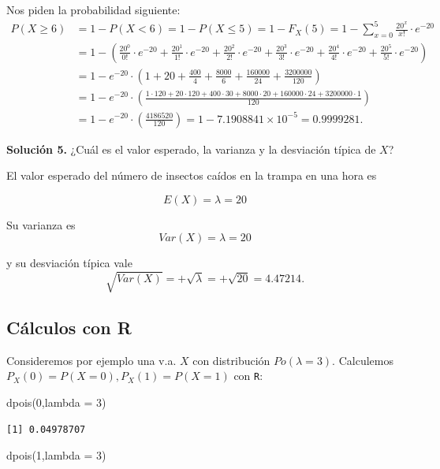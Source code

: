 \documentclass[
  letterpaper,
  DIV=11,
  numbers=noendperiod]{scrreprt}
\newenvironment{Shaded}{\begin{snugshade}}{\end{snugshade}}
\newcommand{\AttributeTok}[1]{\textcolor[rgb]{0.40,0.45,0.13}{#1}}
\newcommand{\DecValTok}[1]{\textcolor[rgb]{0.68,0.00,0.00}{#1}}
\newcommand{\FunctionTok}[1]{\textcolor[rgb]{0.28,0.35,0.67}{#1}}
\newcommand{\NormalTok}[1]{\textcolor[rgb]{0.00,0.23,0.31}{#1}}
\begin{document}
Nos piden la probabilidad siguiente: \[
\begin{array}{rl}
 P(X\geq 6)&=1- P(X<6)=1-P(X\leq 5)=1-F_X(5)=1-\displaystyle\sum_{x=0}^{5} \frac{20^{x}}{x!}\cdot e^{-20}\\
 &=
 1-\left(\frac{20^{0}}{0!}\cdot e^{-20}+\frac{20^{1}}{1!}\cdot e^{-20}+\frac{20^{2}}{2!}\cdot e^{-20}+\frac{20^{3}}{3!}\cdot e^{-20}+\frac{20^{4}}{4!}\cdot e^{-20}+\frac{20^{5}}{5!}\cdot e^{-20}\right)\\
 &=
 1-e^{-20}\cdot \left(1+20+\frac{400}{4}+\frac{8000}{6}+\frac{160000}{24}+\frac{3200000}{120}\right)\\
 &=
 1-e^{-20} \cdot \left(\frac{1 \cdot 120+20\cdot 120+400\cdot 30+8000\cdot 20+160000\cdot 24+3200000\cdot 1}{120}\right)\\
 &= 1-e^{-20}\cdot\left(\frac{4186520}{120}\right)=1-\ensuremath{7.1908841\times 10^{-5}} =0.9999281.
\end{array}
\]

\textbf{Solución 5.} ¿Cuál es el valor esperado, la varianza y la
desviación típica de \(X\)?

El valor esperado del número de insectos caídos en la trampa en una hora
es

\[E(X)=\lambda=20\]

Su varianza es \[Var(X)=\lambda=20\]

y su desviación típica vale
\[\sqrt{Var(X)}=+\sqrt{\lambda}=+\sqrt{20}=4.47214.\]

\subsection{Cálculos con R}\label{cuxe1lculos-con-r-1}

Consideremos por ejemplo una v.a. \(X\) con distribución
\(Po(\lambda=3)\). Calculemos \(P_X(0)=P(X=0), P_X(1)=P(X=1)\) con
\texttt{R}:

\begin{Shaded}
\begin{Highlighting}[]
\FunctionTok{dpois}\NormalTok{(}\DecValTok{0}\NormalTok{,}\AttributeTok{lambda =} \DecValTok{3}\NormalTok{)}
\end{Highlighting}
\end{Shaded}

\begin{verbatim}
[1] 0.04978707
\end{verbatim}

\begin{Shaded}
\begin{Highlighting}[]
\FunctionTok{dpois}\NormalTok{(}\DecValTok{1}\NormalTok{,}\AttributeTok{lambda =} \DecValTok{3}\NormalTok{)}
\end{Highlighting}
\end{Shaded}
\end{document}

